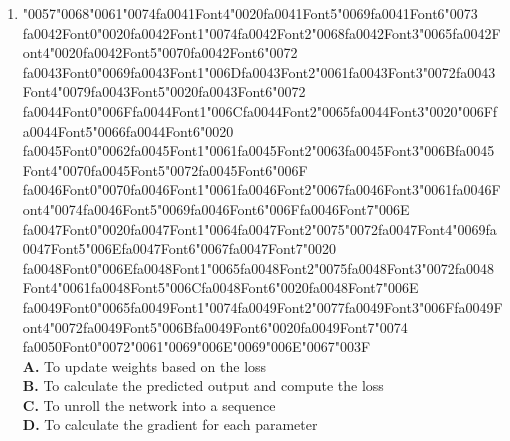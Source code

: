 \documentclass[11pt]{article}
\begin{document}
\begin{enumerate}[label=Q\arabic*., leftmargin=*]
\item {\char"0057}{\char"0068}{\char"0061}{\char"0074}{\csname fa0041Font4\endcsname\char"0020}{\csname fa0041Font5\endcsname\char"0069}{\csname fa0041Font6\endcsname\char"0073} {\csname fa0042Font0\endcsname\char"0020}{\csname fa0042Font1\endcsname\char"0074}{\csname fa0042Font2\endcsname\char"0068}{\csname fa0042Font3\endcsname\char"0065}{\csname fa0042Font4\endcsname\char"0020}{\csname fa0042Font5\endcsname\char"0070}{\csname fa0042Font6\endcsname\char"0072} {\csname fa0043Font0\endcsname\char"0069}{\csname fa0043Font1\endcsname\char"006D}{\csname fa0043Font2\endcsname\char"0061}{\csname fa0043Font3\endcsname\char"0072}{\csname fa0043Font4\endcsname\char"0079}{\csname fa0043Font5\endcsname\char"0020}{\csname fa0043Font6\endcsname\char"0072} {\csname fa0044Font0\endcsname\char"006F}{\csname fa0044Font1\endcsname\char"006C}{\csname fa0044Font2\endcsname\char"0065}{\csname fa0044Font3\endcsname\char"0020}{\char"006F}{\csname fa0044Font5\endcsname\char"0066}{\csname fa0044Font6\endcsname\char"0020} {\csname fa0045Font0\endcsname\char"0062}{\csname fa0045Font1\endcsname\char"0061}{\csname fa0045Font2\endcsname\char"0063}{\csname fa0045Font3\endcsname\char"006B}{\csname fa0045Font4\endcsname\char"0070}{\csname fa0045Font5\endcsname\char"0072}{\csname fa0045Font6\endcsname\char"006F} {\csname fa0046Font0\endcsname\char"0070}{\csname fa0046Font1\endcsname\char"0061}{\csname fa0046Font2\endcsname\char"0067}{\csname fa0046Font3\endcsname\char"0061}{\csname fa0046Font4\endcsname\char"0074}{\csname fa0046Font5\endcsname\char"0069}{\csname fa0046Font6\endcsname\char"006F}{\csname fa0046Font7\endcsname\char"006E} {\csname fa0047Font0\endcsname\char"0020}{\csname fa0047Font1\endcsname\char"0064}{\csname fa0047Font2\endcsname\char"0075}{\char"0072}{\csname fa0047Font4\endcsname\char"0069}{\csname fa0047Font5\endcsname\char"006E}{\csname fa0047Font6\endcsname\char"0067}{\csname fa0047Font7\endcsname\char"0020} {\csname fa0048Font0\endcsname\char"006E}{\csname fa0048Font1\endcsname\char"0065}{\csname fa0048Font2\endcsname\char"0075}{\csname fa0048Font3\endcsname\char"0072}{\csname fa0048Font4\endcsname\char"0061}{\csname fa0048Font5\endcsname\char"006C}{\csname fa0048Font6\endcsname\char"0020}{\csname fa0048Font7\endcsname\char"006E} {\csname fa0049Font0\endcsname\char"0065}{\csname fa0049Font1\endcsname\char"0074}{\csname fa0049Font2\endcsname\char"0077}{\csname fa0049Font3\endcsname\char"006F}{\csname fa0049Font4\endcsname\char"0072}{\csname fa0049Font5\endcsname\char"006B}{\csname fa0049Font6\endcsname\char"0020}{\csname fa0049Font7\endcsname\char"0074} {\csname fa0050Font0\endcsname\char"0072}{\char"0061}{\char"0069}{\char"006E}{\char"0069}{\char"006E}{\char"0067}{\char"003F}\\[0.25em]
\textbf{A.} To update weights based on the loss\\
\textbf{B.} To calculate the predicted output and compute the loss\\
\textbf{C.} To unroll the network into a sequence\\
\textbf{D.} To calculate the gradient for each parameter


\end{enumerate}
\end{document}
